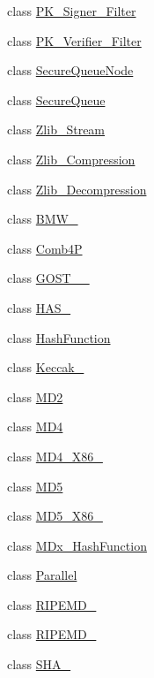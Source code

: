 \begin{DoxyCompactItemize}
\item 
class \hyperlink{classBotan_1_1PK__Signer__Filter}{P\-K\-\_\-\-Signer\-\_\-\-Filter}
\item 
class \hyperlink{classBotan_1_1PK__Verifier__Filter}{P\-K\-\_\-\-Verifier\-\_\-\-Filter}
\item 
class \hyperlink{classBotan_1_1SecureQueueNode}{Secure\-Queue\-Node}
\item 
class \hyperlink{classBotan_1_1SecureQueue}{Secure\-Queue}
\item 
class \hyperlink{classBotan_1_1Zlib__Stream}{Zlib\-\_\-\-Stream}
\item 
class \hyperlink{classBotan_1_1Zlib__Compression}{Zlib\-\_\-\-Compression}
\item 
class \hyperlink{classBotan_1_1Zlib__Decompression}{Zlib\-\_\-\-Decompression}
\item 
class \hyperlink{classBotan_1_1BMW__512}{B\-M\-W\-\_}
\item 
class \hyperlink{classBotan_1_1Comb4P}{Comb4\-P}
\item 
class \hyperlink{classBotan_1_1GOST__34__11}{G\-O\-S\-T\-\_\-\_}
\item 
class \hyperlink{classBotan_1_1HAS__160}{H\-A\-S\-\_}
\item 
class \hyperlink{classBotan_1_1HashFunction}{Hash\-Function}
\item 
class \hyperlink{classBotan_1_1Keccak__1600}{Keccak\-\_}
\item 
class \hyperlink{classBotan_1_1MD2}{M\-D2}
\item 
class \hyperlink{classBotan_1_1MD4}{M\-D4}
\item 
class \hyperlink{classBotan_1_1MD4__X86__32}{M\-D4\-\_\-\-X86\-\_}
\item 
class \hyperlink{classBotan_1_1MD5}{M\-D5}
\item 
class \hyperlink{classBotan_1_1MD5__X86__32}{M\-D5\-\_\-\-X86\-\_}
\item 
class \hyperlink{classBotan_1_1MDx__HashFunction}{M\-Dx\-\_\-\-Hash\-Function}
\item 
class \hyperlink{classBotan_1_1Parallel}{Parallel}
\item 
class \hyperlink{classBotan_1_1RIPEMD__128}{R\-I\-P\-E\-M\-D\-\_}
\item 
class \hyperlink{classBotan_1_1RIPEMD__160}{R\-I\-P\-E\-M\-D\-\_}
\item 
class \hyperlink{classBotan_1_1SHA__160}{S\-H\-A\-\_}
\item 

\end{DoxyCompactItemize}
